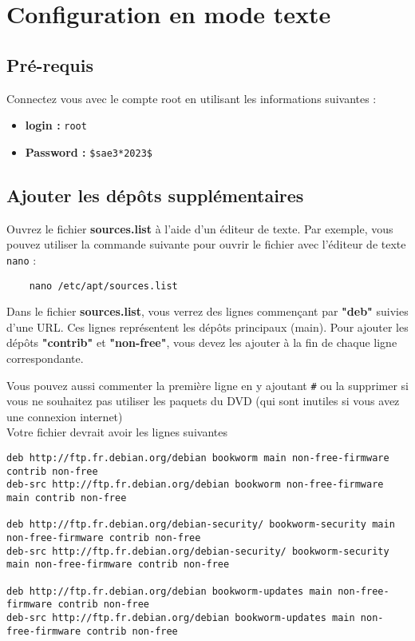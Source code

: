 \chapter{Configuration en mode texte}

\section{Pré-requis}
Connectez vous avec le compte root en utilisant les informations suivantes :
\begin{itemize}
	\item \textbf{login :} \texttt{root}
	\item \textbf{Password :} \texttt{\$sae3*2023\$}
\end{itemize}

\section{Ajouter les dépôts supplémentaires}
Ouvrez le fichier \textbf{sources.list} à l'aide d'un éditeur de texte. Par exemple, vous pouvez utiliser la commande suivante pour ouvrir le fichier avec l'éditeur de texte \texttt{nano} :
\begin{lstlisting}
	nano /etc/apt/sources.list
\end{lstlisting}

Dans le fichier \textbf{sources.list}, vous verrez des lignes commençant par \textbf{"deb"} suivies d'une URL. Ces lignes représentent les dépôts principaux (main). Pour ajouter les dépôts \textbf{"contrib"} et \textbf{"non-free"}, vous devez les ajouter à la fin de chaque ligne correspondante.

Vous pouvez aussi commenter la première ligne en y ajoutant \texttt{\#} ou la supprimer si vous ne souhaitez pas utiliser les paquets du DVD (qui sont inutiles si vous avez une connexion internet)\\

Votre fichier devrait avoir les lignes suivantes
\begin{lstlisting}[style=tf]
deb http://ftp.fr.debian.org/debian bookworm main non-free-firmware contrib non-free
deb-src http://ftp.fr.debian.org/debian bookworm non-free-firmware main contrib non-free

deb http://ftp.fr.debian.org/debian-security/ bookworm-security main non-free-firmware contrib non-free
deb-src http://ftp.fr.debian.org/debian-security/ bookworm-security main non-free-firmware contrib non-free

deb http://ftp.fr.debian.org/debian bookworm-updates main non-free-firmware contrib non-free
deb-src http://ftp.fr.debian.org/debian bookworm-updates main non-free-firmware contrib non-free
\end{lstlisting}

